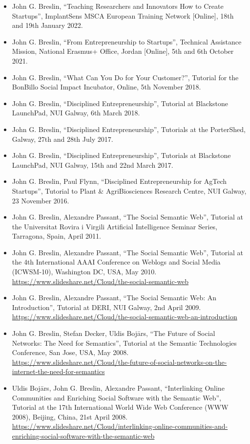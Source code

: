 \documentclass[10pt,a4paper]{res} %
\begin{document}
\begin{resume}
\begin{itemize} \itemsep -2pt
\item John G. Breslin, ``Teaching Researchers and Innovators How to Create Startups'', ImplantSens MSCA European Training Network [Online], 18th and 19th January 2022.
\item John G. Breslin, ``From Entrepreneurship to Startups'', Technical Assistance Mission, National Erasmus+ Office, Jordan [Online], 5th and 6th October 2021. %
\item John G. Breslin, ``What Can You Do for Your Customer?'', Tutorial for the BonBillo Social Impact Incubator, Online, 5th November 2018. %
\item John G. Breslin, ``Disciplined Entrepreneurship'', Tutorial at Blackstone LaunchPad, NUI Galway, 6th March 2018. %
\item John G. Breslin, ``Disciplined Entrepreneurship'', Tutorials at the PorterShed, Galway, 27th and 28th July 2017. %
\item John G. Breslin, ``Disciplined Entrepreneurship'', Tutorials at Blackstone LaunchPad, NUI Galway, 15th and 22nd March 2017. %
\item John G. Breslin, Paul Flynn, ``Disciplined Entrepreneurship for AgTech Startups'', Tutorial to Plant \& AgriBiosciences Research Centre, NUI Galway, 23 November 2016. %
\item John G. Breslin, Alexandre Passant, ``The Social Semantic Web'', Tutorial at the Universitat Rovira i Virgili Artificial Intelligence Seminar Series, Tarragona, Spain, April 2011. %
\item John G. Breslin, Alexandre Passant, ``The Social Semantic Web'', Tutorial at the 4th International AAAI Conference on Weblogs and Social Media (ICWSM-10), Washington DC, USA, May 2010. \url{https://www.slideshare.net/Cloud/the-social-semantic-web}
\item John G. Breslin, Alexandre Passant, ``The Social Semantic Web: An Introduction'', Tutorial at DERI, NUI Galway, 2nd April 2009. \url{https://www.slideshare.net/Cloud/the-social-semantic-web-an-introduction}
\item John G. Breslin, Stefan Decker, Uldis Boj\={a}rs, ``The Future of Social Networks: The Need for Semantics'', Tutorial at the Semantic Technologies Conference, San Jose, USA, May 2008. \url{https://www.slideshare.net/Cloud/the-future-of-social-networks-on-the-internet-the-need-for-semantics}
\item Uldis Boj\={a}rs, John G. Breslin, Alexandre Passant, ``Interlinking Online Communities and Enriching Social Software with the Semantic Web'', Tutorial at the 17th International World Wide Web Conference (WWW 2008), Beijing, China, 21st April 2008. \url{https://www.slideshare.net/Cloud/interlinking-online-communities-and-enriching-social-software-with-the-semantic-web}

\end{itemize}
\end{resume}
\end{document}
